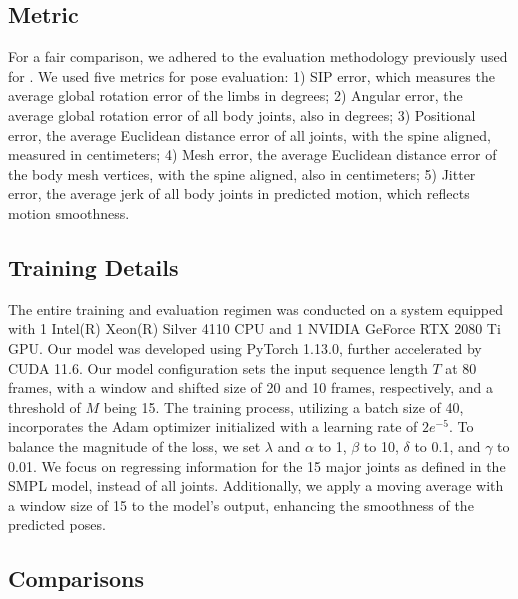 \documentclass[letterpaper]{article} %
\begin{document}
\subsection{Metric}

For a fair comparison, we adhered to the evaluation methodology previously used for \cite{yi2021transpose}. We used five metrics for pose evaluation: 1) SIP error, which measures the average global rotation error of the limbs in degrees; 2) Angular error, the average global rotation error of all body joints, also in degrees; 3) Positional error, the average Euclidean distance error of all joints, with the spine aligned, measured in centimeters; 4) Mesh error, the average Euclidean distance error of the body mesh vertices, with the spine aligned, also in centimeters; 5) Jitter error, the average jerk of all body joints in predicted motion, which reflects motion smoothness.



\subsection{Training Details}

The entire training and evaluation regimen was conducted on a system equipped with 1 Intel(R) Xeon(R) Silver 4110 CPU and 1 NVIDIA GeForce RTX 2080 Ti GPU. Our model was developed using PyTorch 1.13.0, further accelerated by CUDA 11.6. Our model configuration sets the input sequence length $T$ at 80 frames, with a window and shifted size of 20 and 10 frames, respectively, and a threshold of $M$ being 15. The training process, utilizing a batch size of 40, incorporates the Adam optimizer \cite{kingma2014adam} initialized with a learning rate of $2e^{-5}$. To balance the magnitude of the loss, we set $\lambda$ and  $\alpha$ to 1, $\beta$ to 10, $\delta$ to 0.1, and $\gamma$ to 0.01. We focus on regressing information for the 15 major joints as defined in the SMPL model, instead of all joints. Additionally, we apply a moving average with a window size of 15 to the model's output, enhancing the smoothness of the predicted poses.

\subsection{Comparisons}
\end{document}
